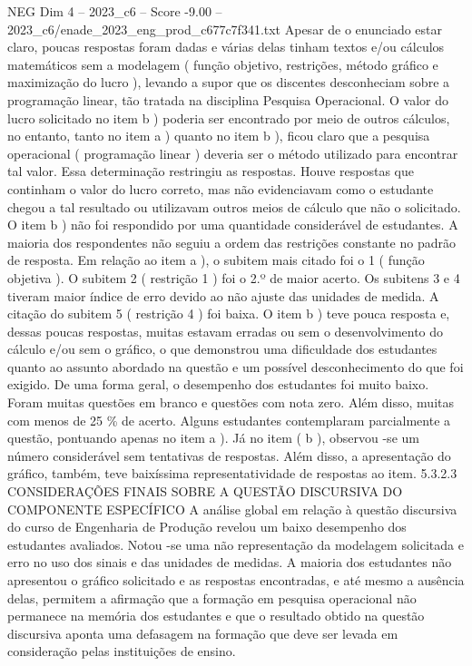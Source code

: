 \begin{textsample}{NEG Dim 4 – 2023\_c6 – Score -9.00 – 2023\_c6/enade\_2023\_eng\_prod\_c677c7f341.txt}
Apesar de o enunciado estar claro, poucas respostas foram dadas e várias delas tinham textos e/ou cálculos matemáticos sem a modelagem ( função objetivo, restrições, método gráfico e maximização do lucro ), levando a supor que os discentes desconheciam sobre a programação linear, tão tratada na disciplina Pesquisa Operacional.
O valor do lucro solicitado no item b ) poderia ser encontrado por meio de outros cálculos, no entanto, tanto no item a ) quanto no item b ), ficou claro que a pesquisa operacional ( programação linear ) deveria ser o método utilizado para encontrar tal valor.
Essa determinação restringiu as respostas.
Houve respostas que continham o valor do lucro correto, mas não evidenciavam como o estudante chegou a tal resultado ou utilizavam outros meios de cálculo que não o solicitado.
O item b ) não foi respondido por uma quantidade considerável de estudantes.
A maioria dos respondentes não seguiu a ordem das restrições constante no padrão de resposta.
Em relação ao item a ), o subitem mais citado foi o 1 ( função objetiva ).
O subitem 2 ( restrição 1 ) foi o 2.º de maior acerto.
Os subitens 3 e 4 tiveram maior índice de erro devido ao não ajuste das unidades de medida.
A citação do subitem 5 ( restrição 4 ) foi baixa.
O item b ) teve pouca resposta e, dessas poucas respostas, muitas estavam erradas ou sem o desenvolvimento do cálculo e/ou sem o gráfico, o que demonstrou uma dificuldade dos estudantes quanto ao assunto abordado na questão e um possível desconhecimento do que foi exigido.
De uma forma geral, o desempenho dos estudantes foi muito baixo.
Foram muitas questões em branco e questões com nota zero.
Além disso, muitas com menos de 25 \% de acerto.
Alguns estudantes contemplaram parcialmente a questão, pontuando apenas no item a ).
Já no item ( b ), observou -se um número considerável sem tentativas de respostas.
Além disso, a apresentação do gráfico, também, teve baixíssima representatividade de respostas ao item. 5.3.2.3 CONSIDERAÇÕES FINAIS SOBRE A QUESTÃO DISCURSIVA DO COMPONENTE ESPECÍFICO A análise global em relação à questão discursiva do curso de Engenharia de Produção revelou um baixo desempenho dos estudantes avaliados.
Notou -se uma não representação da modelagem solicitada e erro no uso dos sinais e das unidades de medidas.
A maioria dos estudantes não apresentou o gráfico solicitado e as respostas encontradas, e até mesmo a ausência delas, permitem a afirmação que a formação em pesquisa operacional não permanece na memória dos estudantes e que o resultado obtido na questão discursiva aponta uma defasagem na formação que deve ser levada em consideração pelas instituições de ensino.

\end{textsample}
